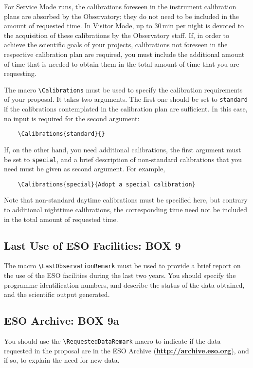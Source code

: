 \documentclass{article}
\begin{document}
For Service Mode runs, the calibrations foreseen in the instrument
calibration plans are 
absorbed by the Observatory; they do not need to be included in the
amount of requested time. In Visitor Mode, up to
30\,min per night is devoted to the acquisition of these calibrations
by the Observatory staff. If, in order to achieve the scientific goals
of your projects, calibrations not foreseen in the respective
calibration plan are required, you must include the additional amount
of time that is needed to obtain them in the total amount of time that
you are requesting. 

The macro \verb|\Calibrations| must be used to specify the calibration
requirements of your proposal. It takes two arguments. The first one
should be set to \verb|standard| if the calibrations contemplated in
the calibration plan are sufficient. In this case, no input is
required for the second argument:
\begin{verbatim}
    \Calibrations{standard}{}
\end{verbatim} 
If, on the other hand, you need
additional calibrations, the first argument must be set to
\verb|special|, and a brief description of non-standard calibrations
that you need must be given as second argument. For example,
\begin{verbatim}
    \Calibrations{special}{Adopt a special calibration}
\end{verbatim} 
Note that non-standard
daytime calibrations must be specified here, but contrary to
additional nighttime calibrations, the corresponding time need not 
be included in the total amount of requested time. 

\subsection{Last Use of ESO Facilities: {\bf BOX 9}}
The macro \verb|\LastObservationRemark| must be used to 
provide a brief report on the use of the ESO facilities during the
last two years. You should specify the programme identification
numbers, and describe the status of the data obtained, and the 
scientific output generated.

\subsection{ESO Archive: {\bf BOX 9a}}
You should use the \verb|\RequestedDataRemark| macro to indicate if
the data requested in the proposal are in the ESO Archive
(\href{http://archive.eso.org}{\bf\underline{http://archive.eso.org}}), and if so, to explain the need for new data.
\end{document}
